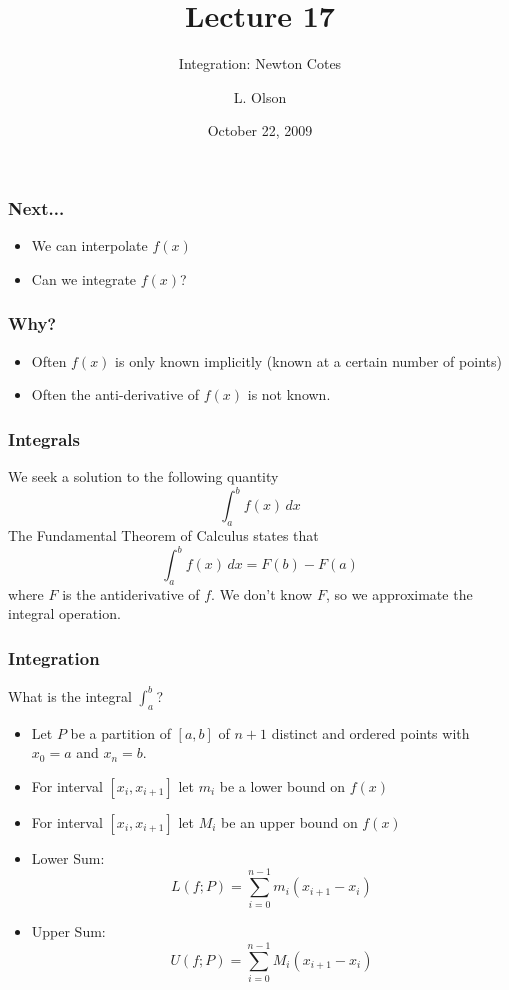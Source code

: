 \documentclass[10pt]{beamer}
\author{L. Olson}
\institute[UIUC]
{Department of Computer Science\\
University of Illinois at Urbana-Champaign\\
\vspace{0.5cm}
}
\title[CS 357]{Lecture 17}
\subtitle{Integration: Newton Cotes}
\date{October 22, 2009}
\begin{document}
\begin{frame}
  \titlepage
\end{frame}
\begin{frame}
\frametitle{Next...}
\begin{itemize}
  \item We can interpolate $f(x)$
  \item Can we integrate $f(x)$?
\end{itemize}
\end{frame}
\begin{frame}
\frametitle{Why?}
\begin{itemize}
  \item Often $f(x)$ is only known implicitly (known at a certain number of
points)
\vspace{1cm}

  \item Often the anti-derivative of $f(x)$ is not known.
\end{itemize}
\end{frame}
\begin{frame}
\frametitle{Integrals}
We seek a solution to the following quantity
\begin{equation*}
  \int_{a}^{b} f(x) \,dx
\end{equation*}
The Fundamental Theorem of Calculus states that 
\begin{equation*}
  \int_{a}^{b} f(x) \,dx = F(b) - F(a)
\end{equation*}
where $F$ is the antiderivative of $f$.  We don't know $F$, so we
approximate the integral operation.
\end{frame}
\begin{frame}
\frametitle{Integration}
What is the integral $\int_{a}^{b}$?
\begin{itemize}
  \item Let $P$ be a partition of $[a,b]$ of $n+1$ distinct and ordered
points with $x_0 = a$ and $x_n =b$.
  \item For interval $[x_i,x_{i+1}]$ let $m_i$ be a lower bound on $f(x)$
  \item For interval $[x_i,x_{i+1}]$ let $M_i$ be an upper bound on $f(x)$
  \item Lower Sum:
  \begin{equation*}
  L(f;P) = \sum_{i=0}^{n-1} m_i (x_{i+1}-x_i)
\end{equation*}
  \item Upper Sum:
  \begin{equation*}
  U(f;P) = \sum_{i=0}^{n-1} M_i (x_{i+1}-x_i)
\end{equation*}
\end{itemize}
\end{frame}
\end{document}
